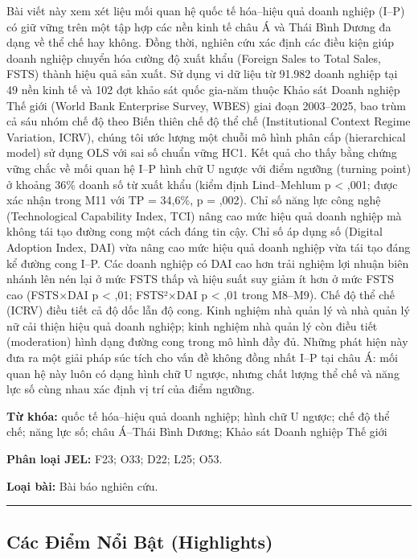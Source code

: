 \documentclass[12pt,a4paper]{article}
\begin{document}
Bài viết này xem xét liệu mối quan hệ quốc tế hóa--hiệu quả doanh nghiệp
(I--P) có giữ vững trên một tập hợp các nền kinh tế châu Á và Thái Bình
Dương đa dạng về thể chế hay không. Đồng thời, nghiên cứu xác định các
điều kiện giúp doanh nghiệp chuyển hóa cường độ xuất khẩu (Foreign Sales
to Total Sales, FSTS) thành hiệu quả sản xuất. Sử dụng vi dữ liệu từ
91.982 doanh nghiệp tại 49 nền kinh tế và 102 đợt khảo sát quốc gia-năm
thuộc Khảo sát Doanh nghiệp Thế giới (World Bank Enterprise Survey,
WBES) giai đoạn 2003--2025, bao trùm cả sáu nhóm chế độ theo Biến thiên
chế độ thể chế (Institutional Context Regime Variation, ICRV), chúng tôi
ước lượng một chuỗi mô hình phân cấp (hierarchical model) sử dụng OLS
với sai số chuẩn vững HC1. Kết quả cho thấy bằng chứng vững chắc về mối
quan hệ I--P hình chữ U ngược với điểm ngưỡng (turning point) ở khoảng
36\% doanh số từ xuất khẩu (kiểm định Lind--Mehlum p \textless{} ,001;
được xác nhận trong M11 với TP = 34,6\%, p = ,002). Chỉ số năng lực công
nghệ (Technological Capability Index, TCI) nâng cao mức hiệu quả doanh
nghiệp mà không tái tạo đường cong một cách đáng tin cậy. Chỉ số áp dụng
số (Digital Adoption Index, DAI) vừa nâng cao mức hiệu quả doanh nghiệp
vừa tái tạo đáng kể đường cong I--P. Các doanh nghiệp có DAI cao hơn
trải nghiệm lợi nhuận biên nhánh lên nén lại ở mức FSTS thấp và hiệu
suất suy giảm ít hơn ở mức FSTS cao (FSTS×DAI p \textless{} ,01;
FSTS²×DAI p \textless{} ,01 trong M8--M9). Chế độ thể chế (ICRV) điều
tiết cả độ dốc lẫn độ cong. Kinh nghiệm nhà quản lý và nhà quản lý nữ
cải thiện hiệu quả doanh nghiệp; kinh nghiệm nhà quản lý còn điều tiết
(moderation) hình dạng đường cong trong mô hình đầy đủ. Những phát hiện
này đưa ra một giải pháp súc tích cho vấn đề không đồng nhất I--P tại
châu Á: mối quan hệ này luôn có dạng hình chữ U ngược, nhưng chất lượng
thể chế và năng lực số cùng nhau xác định vị trí của điểm ngưỡng.

\textbf{Từ khóa:} quốc tế hóa--hiệu quả doanh nghiệp; hình chữ U ngược;
chế độ thể chế; năng lực số; châu Á--Thái Bình Dương; Khảo sát Doanh
nghiệp Thế giới

\textbf{Phân loại JEL:} F23; O33; D22; L25; O53.

\textbf{Loại bài:} Bài báo nghiên cứu.

\begin{center}\rule{0.5\linewidth}{0.5pt}\end{center}

\hypertarget{cuxe1c-ux111iux1ec3m-nux1ed5i-bux1eadt-highlights}{%
\subsection{Các Điểm Nổi Bật
(Highlights)}\label{cuxe1c-ux111iux1ec3m-nux1ed5i-bux1eadt-highlights}}
\end{document}
